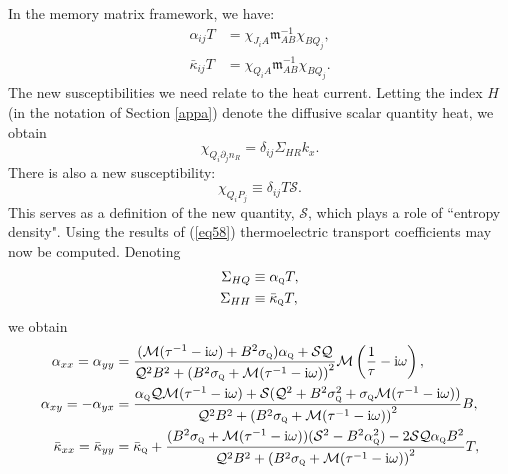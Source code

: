 \documentclass[10pt, oneside]{book}
\begin{document}
\begin{doublespace}
In the memory matrix framework, we have: \begin{subequations}\begin{align}
\alpha_{ij} T &= \chi_{J_i A} \mathfrak{m}^{-1}_{AB}\chi_{BQ_j}, \\
\bar\kappa_{ij} T &= \chi_{Q_iA} \mathfrak{m}^{-1}_{AB}\chi_{BQ_j}.
\end{align}\end{subequations}
The new susceptibilities we need relate to the heat current.   Letting the index $H$ (in the notation of Section \ref{appa}) denote the diffusive scalar quantity heat, we obtain \begin{equation}
\chi_{Q_i \partial_j n_R} = \delta_{ij}\Sigma_{HR} k_x.
\end{equation}
There is also a new susceptibility: \begin{equation}
\chi_{Q_i P_j} \equiv  \delta_{ij} T\mathcal{S}.
\end{equation}
This serves as a definition of the new quantity, $\mathcal{S}$, which plays a role of ``entropy density".  Using the results of (\ref{eq58}) thermoelectric transport coefficients may now be computed.     Denoting \begin{subequations}\begin{align}
\Sigma_{HQ} &\equiv \alpha_{\textsc{q}} T, \\
\Sigma_{HH} &\equiv \bar\kappa_{\textsc{q}} T,
\end{align}\end{subequations}we obtain \begin{subequations}\label{eq:mainres2}\begin{align}
\alpha_{xx} = \alpha_{yy} &= \frac{(\mathcal{M}(\tau^{-1}-\mathrm{i}\omega)+B^2\sigma_{\textsc{q}})\alpha_{\textsc{q}} + \mathcal{SQ}}{\mathcal{Q}^2B^2 + \left(B^2\sigma_{\textsc{q}} + \mathcal{M}(\tau^{-1}-\mathrm{i}\omega)\right)^2} \mathcal{M}\left(\frac{1}{\tau}-\mathrm{i}\omega\right), \\
\alpha_{xy} = -\alpha_{yx} &= \frac{\alpha_{\textsc{q}}\mathcal{QM}(\tau^{-1}-\mathrm{i}\omega)+\mathcal{S}(\mathcal{Q}^2+B^2\sigma^2_{\textsc{q}}+\sigma_{\textsc{q}}\mathcal{M}(\tau^{-1}-\mathrm{i}\omega))}{\mathcal{Q}^2B^2 + \left(B^2\sigma_{\textsc{q}} + \mathcal{M}(\tau^{-1}-\mathrm{i}\omega)\right)^2}B, \\
\bar\kappa_{xx} = \bar\kappa_{yy} &= \bar\kappa_{\textsc{q}} +  \frac{(B^2\sigma_{\textsc{q}} + \mathcal{M}(\tau^{-1}-\mathrm{i}\omega))(\mathcal{S}^2 - B^2\alpha^2_{\textsc{q}})-2\mathcal{SQ}\alpha_{\textsc{q}}B^2}{\mathcal{Q}^2B^2 + \left(B^2\sigma_{\textsc{q}} + \mathcal{M}(\tau^{-1}-\mathrm{i}\omega)\right)^2}T ,\\

\end{align}
\end{subequations}
\end{doublespace}
\end{document}
